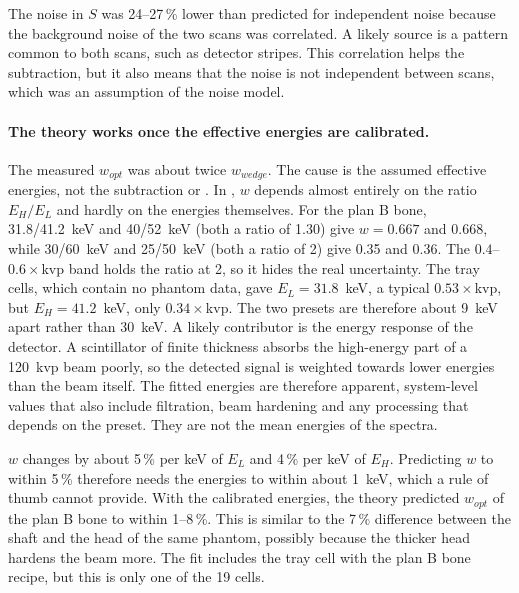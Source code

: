 The noise in $S$ was 24--27\,\% lower than predicted for independent noise because the background noise of the two scans was correlated. A likely source is a pattern common to both scans, such as detector stripes. This correlation helps the subtraction, but it also means that the noise is not independent between scans, which was an assumption of the noise model.

\paragraph{The theory works once the effective energies are calibrated.} The measured $w_{opt}$ was about twice $w_{wedge}$. The cause is the assumed effective energies, not the subtraction or . In , $w$ depends almost entirely on the ratio $E_H/E_L$ and hardly on the energies themselves. For the plan B bone, 31.8/41.2~keV and 40/52~keV (both a ratio of 1.30) give $w = 0.667$ and 0.668, while 30/60~keV and 25/50~keV (both a ratio of 2) give 0.35 and 0.36. The $0.4$--$0.6\times$\gls{kvp} band holds the ratio at 2, so it hides the real uncertainty. The tray cells, which contain no phantom data, gave $E_L = 31.8$~keV, a typical $0.53\times$\gls{kvp}, but $E_H = 41.2$~keV, only $0.34\times$\gls{kvp}. The two presets are therefore about 9~keV apart rather than 30~keV. A likely contributor is the energy response of the detector. A scintillator of finite thickness absorbs the high-energy part of a 120~\gls{kvp} beam poorly, so the detected signal is weighted towards lower energies than the beam itself. The fitted energies are therefore apparent, system-level values that also include filtration, beam hardening and any processing that depends on the preset. They are not the mean energies of the spectra.

$w$ changes by about 5\,\% per keV of $E_L$ and 4\,\% per keV of $E_H$. Predicting $w$ to within 5\,\% therefore needs the energies to within about 1~keV, which a rule of thumb cannot provide. With the calibrated energies, the theory predicted $w_{opt}$ of the plan B bone to within 1--8\,\%. This is similar to the 7\,\% difference between the shaft and the head of the same phantom, possibly because the thicker head hardens the beam more. The fit includes the tray cell with the plan B bone recipe, but this is only one of the 19 cells.

